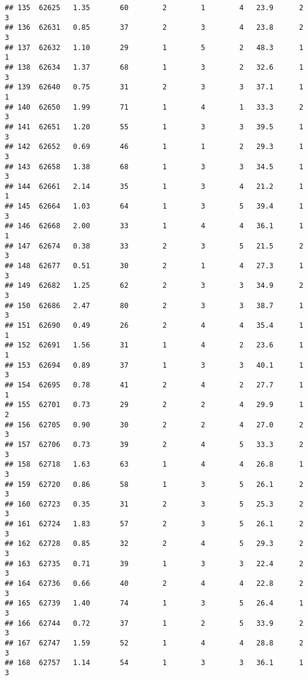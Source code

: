 \documentclass[
]{article}
\begin{document}
\begin{verbatim}
## 135  62625   1.35       60        2        1        4   23.9      2      3
## 136  62631   0.85       37        2        3        4   23.8      2      3
## 137  62632   1.10       29        1        5        2   48.3      1      1
## 138  62634   1.37       68        1        3        2   32.6      1      3
## 139  62640   0.75       31        2        3        3   37.1      1      1
## 140  62650   1.99       71        1        4        1   33.3      2      3
## 141  62651   1.20       55        1        3        3   39.5      1      3
## 142  62652   0.69       46        1        1        2   29.3      1      3
## 143  62658   1.38       68        1        3        3   34.5      1      3
## 144  62661   2.14       35        1        3        4   21.2      1      1
## 145  62664   1.03       64        1        3        5   39.4      1      3
## 146  62668   2.00       33        1        4        4   36.1      1      1
## 147  62674   0.38       33        2        3        5   21.5      2      3
## 148  62677   0.51       30        2        1        4   27.3      1      3
## 149  62682   1.25       62        2        3        3   34.9      2      3
## 150  62686   2.47       80        2        3        3   38.7      1      3
## 151  62690   0.49       26        2        4        4   35.4      1      1
## 152  62691   1.56       31        1        4        2   23.6      1      1
## 153  62694   0.89       37        1        3        3   40.1      1      3
## 154  62695   0.78       41        2        4        2   27.7      1      1
## 155  62701   0.73       29        2        2        4   29.9      1      2
## 156  62705   0.90       30        2        2        4   27.0      2      3
## 157  62706   0.73       39        2        4        5   33.3      2      3
## 158  62718   1.63       63        1        4        4   26.8      1      3
## 159  62720   0.86       58        1        3        5   26.1      2      3
## 160  62723   0.35       31        2        3        5   25.3      2      3
## 161  62724   1.83       57        2        3        5   26.1      2      3
## 162  62728   0.85       32        2        4        5   29.3      2      3
## 163  62735   0.71       39        1        3        3   22.4      2      3
## 164  62736   0.66       40        2        4        4   22.8      2      3
## 165  62739   1.40       74        1        3        5   26.4      1      3
## 166  62744   0.72       37        1        2        5   33.9      2      3
## 167  62747   1.59       52        1        4        4   28.8      2      3
## 168  62757   1.14       54        1        3        3   36.1      1      3

\end{verbatim}
\end{document}
